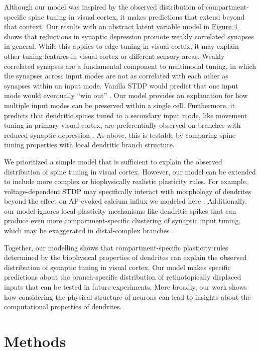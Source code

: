 \documentclass[twocolumn]{theme/bioRxiv}
\begin{document}
Although our model was inspired by the observed distribution of compartment-specific spine tuning in visual cortex, it makes predictions that extend beyond that context. Our results with an abstract latent variable model in \hyperref[fig:4]{Figure 4} shows that reductions in synaptic depression promote weakly correlated synapses in general. While this applies to edge tuning in visual cortex, it may explain other tuning features in visual cortex or different sensory areas. Weakly correlated synapses are a fundamental component to multimodal tuning, in which the synapses across input modes are not as correlated with each other as synapses within an input mode. Vanilla STDP would predict that one input mode would eventually “win out”  \citep{songCompetitiveHebbianLearning2000}. Our model provides an explanation for how multiple input modes can be preserved within a single cell. Furthermore, it predicts that dendritic spines tuned to a secondary input mode, like movement tuning in primary visual cortex, are preferentially observed on branches with reduced synaptic depression \citep{xuNonlinearDendriticIntegration2012,bugeonTranscriptomicAxisPredicts2022}. As above, this is testable by comparing spine tuning properties with local dendritic branch structure.

We prioritized a simple model that is sufficient to explain the observed distribution of spine tuning in visual cortex. However, our model can be extended to include more complex or biophysically realistic plasticity rules. For example, voltage-dependent STDP may specifically interact with morphology of dendrites beyond the effect on AP-evoked calcium influx we modeled here \citep{clopathConnectivityReflectsCoding2010}. Additionally, our model ignores local plasticity mechanisms like dendritic spikes that can produce even more compartment-specific clustering of synaptic input tuning, which may be exaggerated in distal-complex branches \citep{bonoModelingSomaticDendritic2017}.

Together, our modelling shows that compartment-specific plasticity rules determined by the biophysical properties of dendrites can explain the observed distribution of synaptic tuning in visual cortex. Our model makes specific predictions about the branch-specific distribution of retinotopically displaced inputs that can be tested in future experiments. More broadly, our work shows how considering the physical structure of neurons can lead to insights about the computational properties of dendrites. 

\section*{Methods}\label{s:methods}
\end{document}
